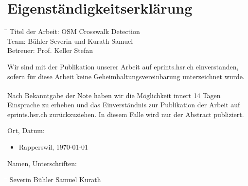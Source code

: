 \chapter{Eigenständigkeitserklärung}

\begin{tabbing}[H]
    \hspace*{4cm}\=\hspace*{6cm}\= \kill
    Titel der Arbeit: \> OSM Crosswalk Detection \\
    Team: \> Bühler Severin und Kurath Samuel \\
    Betreuer: \> Prof. Keller Stefan \\
\end{tabbing}

Wir sind mit der Publikation unserer Arbeit auf eprints.hsr.ch  einverstanden, sofern für diese Arbeit keine Geheimhaltungsvereinbarung unterzeichnet wurde. \\ \\
Nach Bekanntgabe der Note haben wir die Möglichkeit innert 14 Tagen Einsprache zu erheben und das Einverständnis zur Publikation der Arbeit auf eprints.hsr.ch zurückzuziehen. In diesem Falle wird nur der Abstract publiziert.

\vspace{2cm}

Ort, Datum:

\begin{itemize}
	\item[] Rapperswil, \today
\end{itemize}


\vspace{1cm}
Namen, Unterschriften:
\vspace{2cm}
\begin{tabbing}[H]
    \hspace*{6cm}\=\hspace*{6cm}\= \kill
    Severin Bühler \> Samuel Kurath \\
\end{tabbing}
